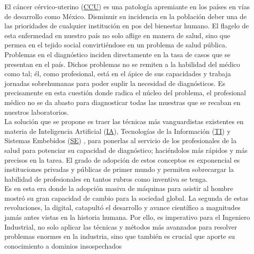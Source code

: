     El cáncer cérvico-uterino (\hyperlink{abbr}{CCU}) es una patología apremiante en los países en vías de
    desarrollo como México. Disminuir su incidencia en la población deber una de
    las prioridades de cualquier institución en pos del bienestar humano. El
    flagelo de esta enfermedad en nuestro país no solo aflige en manera de
    salud, sino que permea en el tejido social convirtiéndose en un problema de
    salud pública.~\cite{INEGI2018} \\
    Problemas en el diagnóstico inciden directamente en la tasa de casos que se
    presentan en el país. Dichos problemas no se remiten a la habilidad del
    médico como tal; él, como profesional, está en el ápice de sus capacidades y
    trabaja jornadas sobrehumanas para poder suplir la necesidad de
    diagnósticos. Es precisamente en esta cuestión donde radica el núcleo del
    problema, el profesional médico no se da abasto para diagnosticar todas las
    muestras que se recaban en nuestros laboratorios.~\cite{Ahlan2014} \\    
    La solución que se propone es traer las técnicas más vanguardistas
    existentes en materia de Inteligencia Artificial
    (\hyperlink{abbr}{IA}),
    Tecnologías de la Información
    (\hyperlink{abbr}{TI}) y
    Sistemas Embebidos
    (\hyperlink{abbr}{SE})
    , para ponerlas al servicio de los profesionales de la salud para potenciar
    su capacidad de diagnóstico; haciéndolos más rápidos y más precisos en la
    tarea. El grado de adopción de estos conceptos es exponencial es
    instituciones privadas y públicas de primer mundo y permiten sobrecargar la
    habilidad de profesionales en tantos rubros como inventiva se
    tenga.~\cite{Bhaskar2016}\\
    Es en esta era donde la adopción masiva de máquinas para asistir al hombre
    mostró su gran capacidad de cambio para la sociedad global. La segunda de
    estas revoluciones, la digital, catapultó el desarrollo y avance científico
    a magnitudes jamás antes vistas en la historia humana. Por ello, es
    imperativo para el Ingeniero Industrial, no solo aplicar las técnicas y
    métodos más avanzados para resolver problemas enormes en la industria, sino
    que también es crucial que aporte su conocimiento a dominios insospechados
